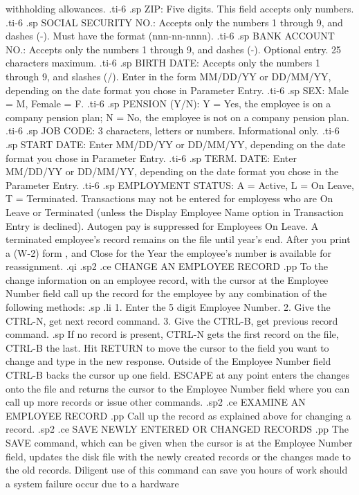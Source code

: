 withholding allowances.
.ti-6
.sp
ZIP: Five digits.  This field accepts only numbers.
.ti-6
.sp
SOCIAL SECURITY NO.: Accepts only the numbers 1 through 9, and dashes
(-). Must have the format (nnn-nn-nnnn).
.ti-6
.sp
BANK ACCOUNT NO.: Accepts only the numbers 1 through 9, and dashes (-).
Optional entry.  25 characters maximum.
.ti-6
.sp
BIRTH DATE: Accepts only the numbers 1 through 9, and slashes (/).
Enter in the form MM/DD/YY or DD/MM/YY, depending on the date
format you chose in Parameter Entry.
.ti-6
.sp
SEX: Male = M, Female = F.
.ti-6
.sp
PENSION (Y/N): Y = Yes, the employee is on a company pension plan;
N = No, the employee is not on a company pension plan.
.ti-6
.sp
JOB CODE: 3 characters, letters or numbers. Informational only.
.ti-6
.sp
START DATE: Enter MM/DD/YY or DD/MM/YY, depending on the date format
you chose in Parameter Entry.
.ti-6
.sp
TERM. DATE: Enter MM/DD/YY or DD/MM/YY, depending on the date format
you chose in the Parameter Entry.
.ti-6
.sp
EMPLOYMENT STATUS: A = Active, L = On Leave, T = Terminated.
Transactions may not be entered for employess who are On Leave
or Terminated (unless the Display Employee Name option in Transaction
Entry is declined). Autogen pay is suppressed for Employees On Leave.
A terminated employee's record remains on the file until year's end.
After you print a (W-2) form , and Close for the Year the employee's
number is available for reassignment.
.qi
.sp2
.ce
CHANGE AN EMPLOYEE RECORD
.pp
To the change information on an employee record,
with the cursor at the Employee Number field call up the record for the
employee by any combination of the following methods:
.sp
.li
	     1. Enter the 5 digit Employee Number.
	     2. Give the CTRL-N, get next record command.
	     3. Give the CTRL-B, get previous record command.
.sp
If no record is present,
CTRL-N gets the first record on the file, CTRL-B the last.
Hit RETURN to move the cursor to the field you want to change and type
in the new response.
Outside of the Employee Number field CTRL-B backs the cursor
up one field.  ESCAPE at
any point enters the changes onto the file and returns the
cursor to the Employee Number field where you can call up more records or
issue other commands.
.sp2
.ce
EXAMINE AN EMPLOYEE RECORD
.pp
Call up the record as explained above
for changing a record.
.sp2
.ce
SAVE NEWLY ENTERED OR CHANGED RECORDS
.pp
The SAVE command, which can
be given when the cursor is at the Employee Number field, updates the
disk file with the newly created records or the changes made to the
old records.  Diligent use of this command can save
you hours of work should a system failure occur due to a hardware
